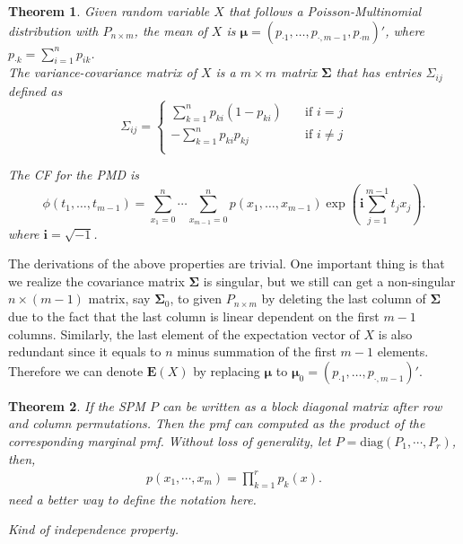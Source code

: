 \documentclass[12pt]{article}
\newcommand{\EE}{\mathbf{E}}
\newcommand{\ivec}{{\boldsymbol{i}}}
\newcommand{\diag}{\textrm{diag}}
\newtheorem{thm}{Theorem}
\begin{document}
\begin{thm}
Given random variable $X$ that follows a Poisson-Multinomial distribution with $P_{n\times m}$, the mean of $X$ is 
   $\boldsymbol{\mu} = \left( p_{\cdot1} ,\dots,p_{\cdot,m-1},p_{\cdot m}\right)'$, where $p_{\cdot k} = \sum_{i=1}^{n}p_{i k}$. \\
The variance-covariance matrix of $X$ is a $m \times m$ matrix $\boldsymbol{\Sigma}$ that has entries $\Sigma_{ij}$ defined as
\begin{equation*}
   \Sigma_{ij} = 
           \begin{cases}
             \sum_{k=1}^{n}p_{ki}(1-p_{ki}) & \quad \text{if } i=j\\
             -\sum_{k=1}^{n}p_{ki}p_{kj} & \quad \text{if } i \neq j\\
           \end{cases}
\end{equation*}

The CF for the PMD is 
\begin{equation*}
\phi(t_1, \dots, t_{m-1})  =  \sum_{x_1 = 0}^{n}\cdots \sum_{x_{m-1} = 0}^n p(x_1,\ldots,x_{m-1})\exp\left(\ivec\sum_{j=1}^{m-1}t_jx_j\right).
\end{equation*}
where  $\ivec=\sqrt{-1}$.
\end{thm}
The derivations of the above properties are trivial. One important thing is that we realize the covariance matrix $\boldsymbol{\Sigma}$ is singular, but we still can get a non-singular $n \times (m-1)$ matrix, say $\boldsymbol{\Sigma}_{0}$, to given $P_{n \times m}$ by deleting the last column of $\boldsymbol{\Sigma}$ due to the fact that the last column is linear dependent on the first $m-1$ columns. Similarly, the last element of the expectation vector of $X$ is also redundant since it equals to $n$ minus summation of the first $m-1$ elements. Therefore we can denote $\EE(X)$ by replacing $\boldsymbol{\mu}$ to $\boldsymbol{\mu}_0 = \left( p_{\cdot1} ,\dots,p_{\cdot,m-1}\right)'$.


\begin{thm}
If the SPM $P$ can be written as a block diagonal matrix after row and column permutations. Then the pmf can computed as the product of the corresponding marginal pmf. Without loss of generality, let
$P=\diag(P_1, \cdots, P_r)$, then,
\begin{align*}
p(x_1, \cdots, x_m)=\prod_{k=1}^rp_k(x).
\end{align*}
need a better way to define the notation here.

Kind of independence property.

\end{thm}
\end{document}
